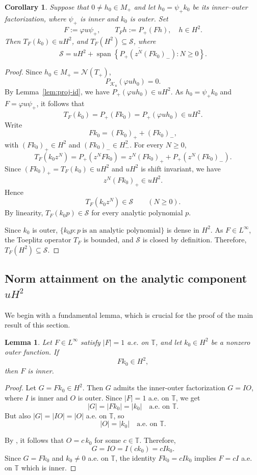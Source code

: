 \documentclass[12pt]{amsart}
\newtheorem{lemma}[theorem]{Lemma}
\newtheorem{corollary}[theorem]{Corollary}
\theoremstyle{definition}
\theoremstyle{remark}
\def \T{\mathbb{T}}
\newcommand{\cln}{\mathcal{N}}
\newcommand{\clk}{\mathcal{K}}
\newcommand{\cls}{\mathcal{S}}
\newcommand{\vp}{\varphi}
\numberwithin{equation}{section}
\begin{document}
\begin{corollary}\label{cor:outer-extremal-range}
Suppose that $0\neq h_0\in M_{+}$ and let $h_0=\psi_{+}k_0$ be its inner--outer factorization, where $\psi_{+}$ is inner and $k_0$ is outer. Set
\[
F:=\vp u\psi_{+},\qquad T_Fh:=P_{+}(Fh),\quad h\in H^2.
\]
Then $T_F(k_0)\in uH^2$, and $T_F(H^2)\subseteq\cls$, where
\[
\cls=\overline{uH^2+\operatorname{span}\left\{P_{+}\left(z^N(Fk_0)_-\right):N\geq0\right\}}.
\]
\end{corollary}

\begin{proof}
Since $h_0\in M_{+}=\cln (T_{+})$,
\[
P_{\clk_u}(\vp uh_0)=0.
\]
By Lemma~\ref{lem:proj-id}, we have $P_{+}(\vp uh_0)\in uH^2$. As $h_0=\psi_{+}k_0$ and $F=\vp u\psi_{+}$, it follows that
\[
T_F(k_0)=P_{+}(Fk_0)=P_{+}(\vp uh_0)\in uH^2.
\]
Write
\[
Fk_0=(Fk_0)_{+}+(Fk_0)_{-},
\]
with $(Fk_0)_{+}\in H^2$ and $(Fk_0)_{-}\in H^2_{-}$. For every $N\geq0$,
\[
T_F(k_0z^N)=P_{+}(z^NFk_0)=z^N(Fk_0)_{+}+P_{+}\left(z^N(Fk_0)_-\right).
\]
Since $(Fk_0)_{+}=T_F(k_0)\in uH^2$ and $uH^2$ is shift invariant, we have
\[
z^N(Fk_0)_+\in uH^2.
\]
Hence
\[
T_F(k_0z^N)\in\cls\qquad(N\geq0).
\]
By linearity, $T_F(k_0p)\in\cls$ for every analytic polynomial $p$.
	
Since $k_0$ is outer, $\{k_0p:p\ \text{is an analytic polynomial}\}$
is dense in $H^2$. As $F\in L^\infty$, the Toeplitz operator $T_F$ is bounded, and $\cls$ is closed by definition. Therefore, $T_F(H^2)\subseteq\cls$.
\end{proof}









\subsection{Norm attainment on the analytic component $uH^2$}
We begin with a fundamental lemma, which is crucial for the proof of the main result of this section.
\begin{lemma}\label{lem:outer-test}
Let $F\in L^\infty$ satisfy $|F|=1$ a.e. on $\T$, and let $k_0\in H^2$
be a nonzero outer function. If
\[
F k_0 \in H^2,
\]
then $F$ is inner.
\end{lemma}

\begin{proof}
Let $G = Fk_0\in H^2$. Then $G$ admits the inner-outer factorization
$G = I O$, where $I$ is inner and $O$ is outer. Since $|F|=1$ a.e. on $\T$, we get
\[|G| = |F k_0| = |k_0| \quad \text{a.e. on } \T.\]  
But also $|G| = |IO| = |O|$ a.e. on $\T$, so
\[
|O| = |k_0|\quad\text{a.e. on }\T.
\]

By \cite[Corollary 6.23]{Douglas1998}, it follows that $O = c\,k_0$ for some $c\in\T$.  
Therefore,
\[
G = IO = I(c k_0) = c I k_0.
\]
Since $G = F k_0$ and $k_0\neq0$ a.e. on $\T$, the identity
$Fk_0=cIk_0$ implies $F=cI$ a.e. on $\T$ which is inner.
\end{proof}
\end{document}
